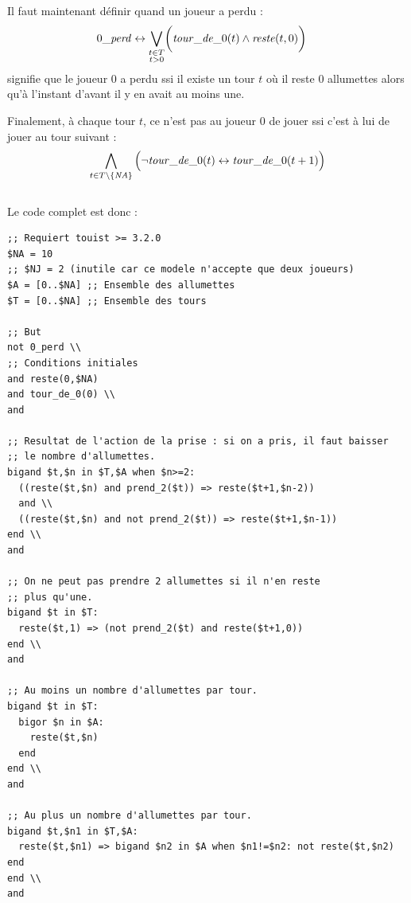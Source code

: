 Il faut maintenant définir quand un joueur a perdu :
\begin{gather}
\begin{split}
\lost \lequiv \bigvee_{\substack{t \in \turnsSet\\ t > 0}} & \bigg ( \turn{t} \land \rest{t}{0} %
\bigg )
\end{split}
\end{gather}
signifie que le joueur $0$ a perdu ssi il existe un tour $t$ où il reste $0$ allumettes alors qu'à l'instant d'avant il y en avait au moins une.

Finalement, à chaque tour $t$, ce n'est pas au joueur $0$ de jouer ssi c'est à lui de jouer au tour suivant :
\begin{gather}
\bigwedge_{t \in T \setminus \{ \mathit{NA} \} } \Big (
    \neg \mathit{tour\_de\_}0(t) \leftrightarrow \mathit{tour\_de\_}0(t+1)
\Big )
\label{eq:turnChange}
\end{gather}~\\[-1em]

\noindent
Le code \touist complet est donc :

\begin{lstlisting}[language=touist,frame=single]
;; Requiert touist >= 3.2.0
$NA = 10
;; $NJ = 2 (inutile car ce modele n'accepte que deux joueurs)
$A = [0..$NA] ;; Ensemble des allumettes
$T = [0..$NA] ;; Ensemble des tours

;; But
not 0_perd \\
;; Conditions initiales
and reste(0,$NA)
and tour_de_0(0) \\
and

;; Resultat de l'action de la prise : si on a pris, il faut baisser
;; le nombre d'allumettes.
bigand $t,$n in $T,$A when $n>=2:
  ((reste($t,$n) and prend_2($t)) => reste($t+1,$n-2))
  and \\
  ((reste($t,$n) and not prend_2($t)) => reste($t+1,$n-1))
end \\
and

;; On ne peut pas prendre 2 allumettes si il n'en reste
;; plus qu'une.
bigand $t in $T:
  reste($t,1) => (not prend_2($t) and reste($t+1,0))
end \\
and

;; Au moins un nombre d'allumettes par tour.
bigand $t in $T:
  bigor $n in $A:
    reste($t,$n)
  end
end \\
and

;; Au plus un nombre d'allumettes par tour.
bigand $t,$n1 in $T,$A:
  reste($t,$n1) => bigand $n2 in $A when $n1!=$n2: not reste($t,$n2) end
end \\
and
\end{lstlisting}

